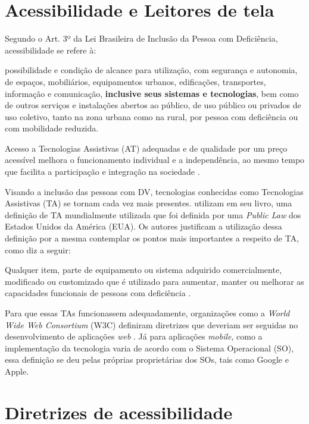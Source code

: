 \section{Acessibilidade e Leitores de tela}

Segundo o Art. 3º da Lei Brasileira de Inclusão da Pessoa com Deficiência, acessibilidade se refere à:

\begin{citacao}
    possibilidade e condição de alcance para utilização, com segurança e autonomia, de espaços, mobiliários, equipamentos urbanos,
    edificações, transportes, informação e comunicação, \textbf{inclusive seus sistemas e tecnologias}, bem como de outros serviços e
    instalações abertos ao público, de uso público ou privados de uso coletivo, tanto na zona urbana como na rural, por pessoa com
    deficiência ou com mobilidade reduzida.
\end{citacao}

Acesso a Tecnologias Assistivas (AT) adequadas e de qualidade por um preço acessível melhora o funcionamento individual e
a independência, ao mesmo tempo que facilita a participação e integração na sociedade \cite{world2019global}.

Visando a inclusão das pessoas com DV, tecnologias conhecidas como Tecnologias Assistivas (TA) se tornam cada vez mais presentes.
 utilizam em seu livro, uma definição de TA mundialmente utilizada que foi definida por uma \textit{Public Law}
dos Estados Unidos da América (EUA). Os autores justificam a utilização dessa definição por a mesma contemplar os pontos mais
importantes a respeito de TA, como diz a seguir:

\begin{citacao}
    Qualquer item, parte de equipamento ou sistema adquirido comercialmente, modificado ou customizado que é utilizado para aumentar, manter ou melhorar as capacidades
    funcionais de pessoas com deficiência \cite{Cook2014}.
\end{citacao}

Para que essas TAs funcionassem adequadamente, organizações como a \textit{World Wide Web Consortium} (W3C) definiram diretrizes que deveriam ser seguidas no desenvolvimento
de aplicações \textit{web} \cite{W3C2019}. Já para aplicações \textit{mobile}, como a implementação da tecnologia varia de acordo com o Sistema Operacional (SO), essa
definição se deu pelas próprias proprietárias dos SOs, tais como Google e Apple.

\section{Diretrizes de acessibilidade}

